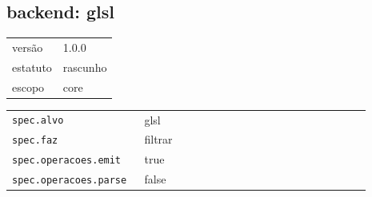 \subsection*{backend: glsl}
\begin{tabular}{@{}ll@{}}
versão & 1.0.0 \\
estatuto & rascunho \\
escopo & core \\
\end{tabular}

\begin{tabular}{@{}p{0.35\linewidth}p{0.6\linewidth}@{}}
\texttt{spec.alvo} & glsl \\
\texttt{spec.faz} & filtrar \\
\texttt{spec.operacoes.emit} & true \\
\texttt{spec.operacoes.parse} & false \\
\end{tabular}
